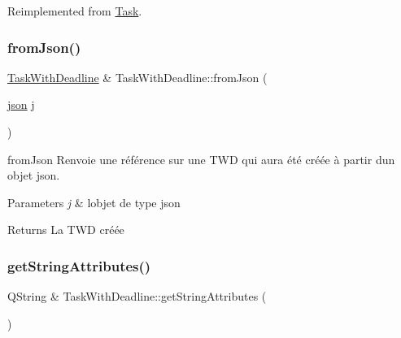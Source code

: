 Reimplemented from \hyperlink{classTask_aaef115655e5c20b9919da726ae526f8a}{Task}.

\mbox{\label{classTaskWithDeadline_a170d73e040f305f255bb0ea6280fbfb8}} 
\subsubsection{\texorpdfstring{from\+Json()}{fromJson()}}
{\footnotesize\ttfamily \hyperlink{classTaskWithDeadline}{Task\+With\+Deadline} \& Task\+With\+Deadline\+::from\+Json (\begin{DoxyParamCaption}\item[{\hyperlink{classnlohmann_1_1basic__json}{json}}]{j }\end{DoxyParamCaption})\hspace{0.3cm}{\ttfamily [static]}}



from\+Json Renvoie une référence sur une T\+WD qui aura été créée à partir d\textquotesingle{}un objet json. 


\begin{DoxyParams}{Parameters}
{\em j} & l\textquotesingle{}objet de type json \\
\hline
\end{DoxyParams}
\begin{DoxyReturn}{Returns}
La T\+WD créée 
\end{DoxyReturn}
\mbox{\label{classTaskWithDeadline_a2fda40b455e7eebb550b41edf451dfdb}} 
\subsubsection{\texorpdfstring{get\+String\+Attributes()}{getStringAttributes()}}
{\footnotesize\ttfamily Q\+String \& Task\+With\+Deadline\+::get\+String\+Attributes (\begin{DoxyParamCaption}{ }\end{DoxyParamCaption})\hspace{0.3cm}{\ttfamily [virtual]}}



